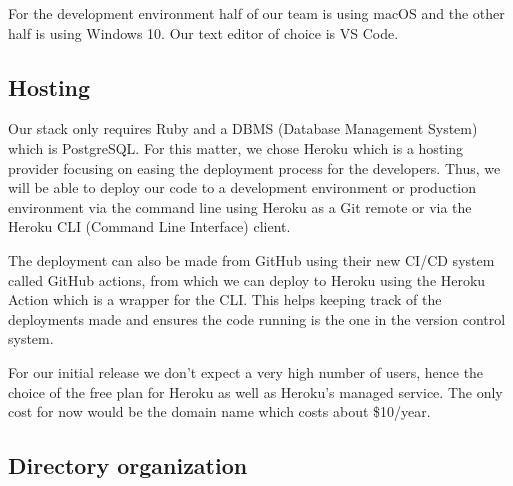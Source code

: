 \documentclass[conference]{IEEEtran}
\begin{document}
For the development environment half of our team is using macOS and the other half is using Windows 10. 
Our text editor of choice is VS Code.

\subsection{Hosting}

Our stack only requires Ruby and a DBMS (Database Management System) which is PostgreSQL. 
For this matter, we chose Heroku which is a hosting provider focusing on easing the deployment process for the developers. 
Thus, we will be able to deploy our code to a development environment or production environment via the command line using Heroku as a Git remote or via the Heroku CLI (Command Line Interface) client.

The deployment can also be made from GitHub using their new CI/CD system called GitHub actions, from which we can deploy to Heroku using the Heroku Action which is a wrapper for the CLI. 
This helps keeping track of the deployments made and ensures the code running is the one in the version control system.

For our initial release we don't expect a very high number of users, hence the choice of the free plan for Heroku as well as Heroku's managed service. 
The only cost for now would be the domain name which costs about \$10/year.



\subsection{Directory organization}
\end{document}
